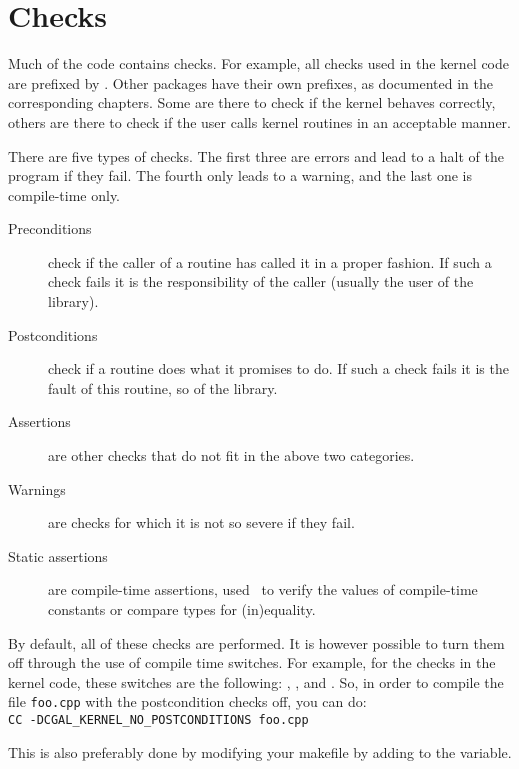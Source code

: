 

\section{Checks\label{sec:checks}}

Much of the {\cgal} code contains checks. 
For example, all checks used in the kernel code are prefixed by 
.
Other packages have their own prefixes, as documented in the corresponding
chapters.
Some are there to check if the kernel behaves correctly, others are there to 
check if the user calls kernel routines in an acceptable manner.

There are five types of checks. 
The first three are errors and lead to a halt of the program if they fail. 
The fourth only leads to a warning, and the last one is compile-time only.
\begin{description}
\item[Preconditions] check if the caller of a routine has called it in a
proper fashion. 
If such a check fails it is the responsibility of the caller 
(usually the user of the library).
\item[Postconditions] check if a routine does what it promises to do. 
If such a check fails it is the fault of this routine, so of the library.
\item[Assertions] are other checks that do not fit in the above two 
categories.
\item[Warnings] are checks for which it is not so severe if they fail.
\item[Static assertions] are compile-time assertions, used \eg~to verify
the values of compile-time constants or compare types for (in)equality.
\end{description}

By default, all of these checks are performed. 
It is however possible to turn them off through the use of compile time 
switches.
For example, for the checks in the kernel code, these switches are the 
following:
, 
,
 and 
.
So, in order to compile the file \verb~foo.cpp~ with the postcondition checks
off, you can do:\\
\verb~CC -DCGAL_KERNEL_NO_POSTCONDITIONS foo.cpp~

This is also preferably done by modifying your makefile by adding
 to the  variable.

